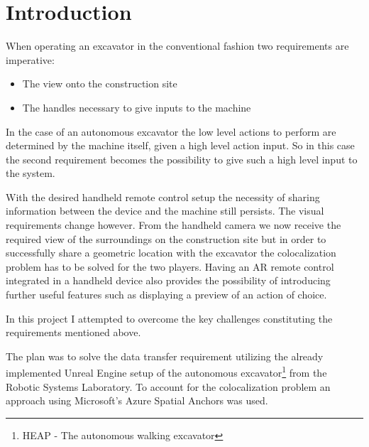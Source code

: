 \chapter{Introduction}
\label{ch:introduction}


When operating an excavator in the conventional fashion two requirements are imperative: \begin{itemize}
    \item The view onto the construction site
    \item The handles necessary to give inputs to the machine
\end{itemize}
In the case of an autonomous excavator the low level actions to perform are determined by the machine itself, given a high level action input. So in this case the second requirement becomes the possibility to give such a high level input to the system.

With the desired handheld remote control setup the necessity of sharing information between the device and the machine still persists. The visual requirements change however. From the handheld camera we now receive the required view of the surroundings on the construction site but in order to successfully share a geometric location with the excavator the colocalization problem has to be solved for the two players. Having an AR remote control integrated in a handheld device also provides the possibility of introducing further useful features such as displaying a preview of an action of choice. 

In this project I attempted to overcome the key challenges constituting the requirements mentioned above. 

The plan was to solve the data transfer requirement utilizing the already implemented Unreal Engine setup of the autonomous excavator\footnote{HEAP - The autonomous walking excavator\citep*{heap}} from the Robotic Systems Laboratory. To account for the colocalization problem an approach using Microsoft's Azure Spatial Anchors was used.